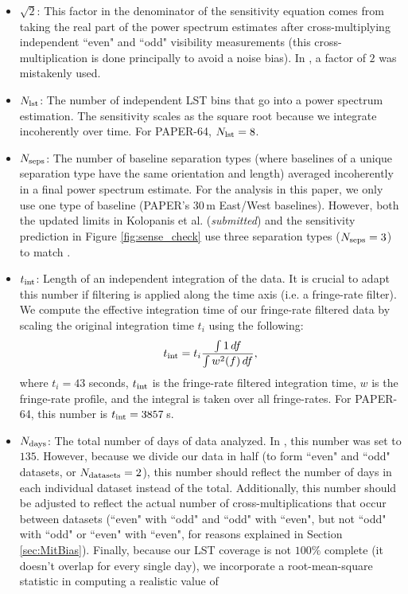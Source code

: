 \documentclass[preprint2,numberedappendix,tighten]{aastex6}  %
\begin{document}
\begin{itemize}
where $\nu$ are frequencies in GHz (\citealt{thompson_et_al2001}). We use a receiver temperature of $144$\,K, yielding $T_{\rm sys} = 431$\,K at $150$\,MHz. 
This is lower than the $T_{\rm sys}$ of $500$\,K used in  because of several small mis-calculation errors that were 
identified\footnote{For example, there was a missing a square root in going from a variance to a standard deviation.}.
\item $\sqrt{2}$: This factor in the denominator of the sensitivity equation comes from taking the real part of the power spectrum 
estimates after cross-multiplying independent ``even" and ``odd" visibility measurements (this cross-multiplication is done principally to avoid a noise bias). In , a factor of $2$ was mistakenly used.
\item $N_{\rm lst}$: The number of independent LST bins that go into a power spectrum estimation. The sensitivity scales as the square root 
because we integrate incoherently over time. For PAPER-64, $N_{\rm lst} = 8$.
\item $N_{\rm seps}$: The number of baseline separation types (where baselines of a unique separation type have the same orientation and length) averaged incoherently in a final power spectrum estimate. For the 
analysis in this paper, we only use one type of baseline (PAPER's 30\,m East/West baselines). However, both the updated limits in Kolopanis et al. (\textit{submitted}) and the sensitivity prediction in Figure \ref{fig:sense_check} use three separation types ($N_{\rm seps}=3$) to match .
\item $t_{\rm int}$: Length of an independent integration of the data. It is crucial to adapt this number if filtering is applied along the time axis (i.e. a 
fringe-rate filter). We compute the effective integration time of our fringe-rate filtered data by scaling the original integration time $t_{i}$
using the following:
\begin{equation}
t_{\rm int} = t_{i} \frac{\int1 \, df}{\int w^{2}(f) \,df},
\end{equation}
where $t_{i}=43$ seconds, $t_{\rm int}$ is the fringe-rate filtered integration time, $w$ is the fringe-rate profile, and the integral is 
taken over all fringe-rates. For PAPER-64, this number is $t_{\rm int} = 3857$\,s. 
\item $N_{\rm days}$: The total number of days of data analyzed. In , this number was set to $135$. However, because we 
divide our data in half (to form ``even" and ``odd" datasets, or $N_{\rm datasets} = 2$), this number should reflect the number of days in each individual dataset instead of the total. Additionally, this number should be adjusted to reflect the actual number of cross-multiplications that occur between datasets (``even" with ``odd" and ``odd" with ``even", but not ``odd" with ``odd" or ``even" with ``even", for reasons explained in Section \ref{sec:MitBias}). Finally, because our LST coverage is not $100\%$ complete (it doesn't overlap for every single day), we incorporate a root-mean-square statistic in computing a realistic value of 

\end{itemize}
\end{document}
